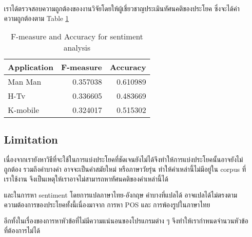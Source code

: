 
เราได้ตรวจสอบความถูกต้องของงานวิจัยโดยให้ผู้เชี่ยวชาญประเมินทัศนคติของประโยค ซึ่งจะได้ค่าความถูกต้องตาม Table \ref{table:f-measureSenti}
\begin{table}
	\caption{F-measure and Accuracy for sentiment analysis}
	\label{table:f-measureSenti}
	\centering
	\begin{tabular}{|l|r|r|}
		\hline
		\multicolumn{1}{|c|}{Application} &
		\multicolumn{1}{|c|}{F-measure} &
		\multicolumn{1}{|c|}{Accuracy} \\
		\hline
		Man Man & 0.357038 & 0.610989\\
		\hline
		H-Tv & 0.336605 & 0.483669 \\
		\hline
		K-mobile & 0.324017 & 0.515302 \\
		\hline
	\end{tabular}
\end{table}
\subsection*{Limitation}
เนื่องจากเรายังหาวิธีที่จะใช้ในการแบ่งประโยคที่ชัดเจนยังไม่ได้จึงทำให้การแบ่งประโยคนั้นอาจยังไม่ถูกต้อง รวมถึงคำบางคำ อาจจะเป็นคำสมัยใหม่ หรือภาษาวัยรุ่น ทำให้คำเหล่านี้ไม่มีอยู่ใน corpus ที่เราใช้งาน จึงเป็นเหตุให้เราอาจไม่สามารถหาทัศนคติของคำเหล่านี้ได้

และในการหา sentiment โดยการแปลภาษาไทย-อังกฤษ คำบางที่แปลได้ อาจแปลได้ไม่ตรงตามความต้องการของประโยคทั้งนี้เนื่องมาจาก การหา POS และ การพ้องรูปในภาษาไทย

อีกทั้งในเรื่องของการหาหัวข้อที่ไม่มีความแน่นอนของโปรแกรมต่าง ๆ จึงทำให้เรากำหนดจำนวนหัวข้อที่ต้องการไม่ได้



%
%


